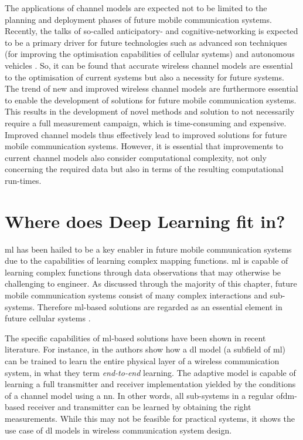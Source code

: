 The applications of channel models are expected not to be limited to the planning and deployment phases of future mobile communication systems. Recently, the talks of so-called anticipatory- and cognitive-networking is expected to be a primary driver for future technologies such as advanced \gls{son} techniques (for improving the optimisation capabilities of cellular systems) and autonomous vehicles \cite{Bui2017ATechniques, Zhang2018}. So, it can be found that accurate wireless channel models are essential to the optimisation of current systems but also a necessity for future systems. The trend of new and improved wireless channel models are furthermore essential to enable the development of solutions for future mobile communication systems. This results in the development of novel methods and solution to not necessarily require a full measurement campaign, which is time-consuming and expensive. Improved channel models thus effectively lead to improved solutions for future mobile communication systems. However, it is essential that improvements to current channel models also consider computational complexity, not only concerning the required data but also in terms of the resulting computational run-times.


\section{Where does Deep Learning fit in?}
\gls{ml} has been hailed to be a key enabler in future mobile communication systems due to the capabilities of learning complex mapping functions. \gls{ml} is capable of learning complex functions through data observations that may otherwise be challenging to engineer. As discussed through the majority of this chapter, future mobile communication systems consist of many complex interactions and sub-systems. Therefore \gls{ml}-based solutions are regarded as an essential element in future cellular systems \cite{Li2017IntelligentIntelligence, Klaine2017ANetworks}. 
 
The specific capabilities of \gls{ml}-based solutions have been shown in recent literature. For instance, in \cite{OShea2017, Dorner2018, Aoudia2018} the authors show how a \gls{dl} model (a subfield of \gls{ml}) can be trained to learn the entire physical layer of a wireless communication system, in what they term \emph{end-to-end} learning. The adaptive model is capable of learning a full transmitter and receiver implementation yielded by the conditions of a channel model using a \gls{nn}. In other words, all sub-systems in a regular \gls{ofdm}-based receiver and transmitter can be learned by obtaining the right measurements. While this may not be feasible for practical systems, it shows the use case of \gls{dl} models in wireless communication system design.


